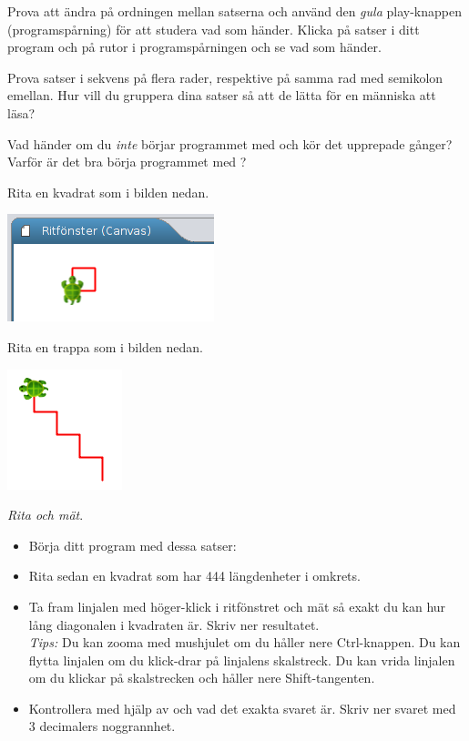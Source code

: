 \Subtask Prova att ändra på ordningen mellan satserna och använd den \emph{gula} play-knappen  (programspårning) för att studera vad som händer. Klicka på satser i ditt program och på rutor i programspårningen och se vad som händer.

\Subtask Prova satser i sekvens på flera rader, respektive på samma rad med semikolon emellan. Hur vill du gruppera dina satser så att de lätta för en människa att läsa?

\Subtask\Pen Vad händer om du \emph{inte} börjar programmet med  och kör det upprepade gånger? Varför är det bra börja programmet med ? 

\Subtask Rita en kvadrat som i bilden nedan.

\includegraphics{../img/kojo/kvadrat}

\Subtask Rita en trappa som i bilden nedan.

\includegraphics[width=0.25\textwidth]{../img/kojo/stairs}

\Subtask \emph{Rita och mät}. 
\begin{itemize}[noitemsep]
\item Börja ditt program med dessa satser:\\  
\item Rita sedan en kvadrat som har 444 längdenheter i omkrets. 
\item Ta fram linjalen med höger-klick i ritfönstret och mät så exakt du kan hur lång diagonalen i kvadraten är. Skriv ner resultatet. \\ \emph{Tips:} Du kan zooma med mushjulet om du håller nere Ctrl-knappen. Du kan flytta linjalen om du klick-drar på linjalens skalstreck. Du kan vrida linjalen om du klickar på skalstrecken och håller nere Shift-tangenten. 
\item Kontrollera med hjälp av  och  vad det exakta svaret är. Skriv ner svaret med 3 decimalers noggrannhet. 
\end{itemize}

